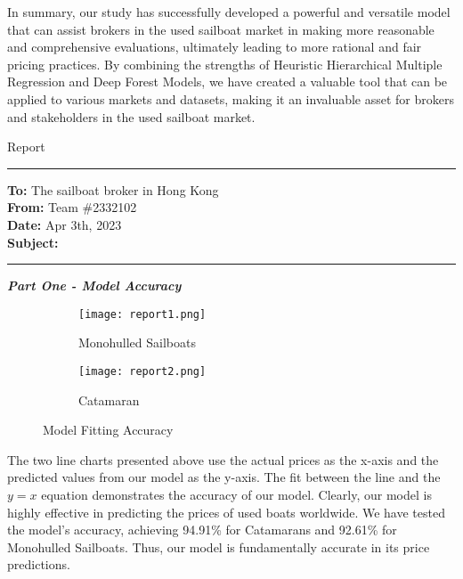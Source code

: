 \documentclass[12pt]{article}  %
\begin{document}
In summary, our study has successfully developed a powerful and versatile model that can assist brokers in the used sailboat market in making more reasonable and comprehensive evaluations, ultimately leading to more rational and fair pricing practices. By combining the strengths of Heuristic Hierarchical Multiple Regression and Deep Forest Models, we have created a valuable tool that can be applied to various markets and datasets, making it an invaluable asset for brokers and stakeholders in the used sailboat market.
\begin{letter}{Report}
\noindent\rule[0.25\baselineskip]{\textwidth}{2pt} 
\begin{flushleft}  %
\textbf{To:} The sailboat broker in Hong Kong\\
\textbf{From:} Team \#2332102\\
\textbf{Date:} Apr 3th, 2023\\
\textbf{Subject:} 
\noindent\rule[0.25\baselineskip]{\textwidth}{1pt}
\end{flushleft}

\noindent \textbf{\emph{Part One - Model Accuracy}}

\begin{figure}[htbp]
    \centering
    \begin{subfigure}[b]{.4\textwidth}
    \texttt{[image: report1.png]}
    \caption{Monohulled Sailboats}\label{subfig:report1}
    \end{subfigure}
    \begin{subfigure}[b]{.4\textwidth}
    \texttt{[image: report2.png]}
    \caption{Catamaran}\label{subfig:report2}
    \end{subfigure}
    \caption{Model Fitting Accuracy}\label{fig:Report1}
\end{figure} 

The two line charts presented above use the actual prices as the x-axis and the predicted values from our model as the y-axis. The fit between the line and the $y=x$ equation demonstrates the accuracy of our model. Clearly, our model is highly effective in predicting the prices of used boats worldwide. We have tested the model's accuracy, achieving 94.91\% for Catamarans and 92.61\% for Monohulled Sailboats. Thus, our model is fundamentally accurate in its price predictions.


\end{letter}
\end{document}
